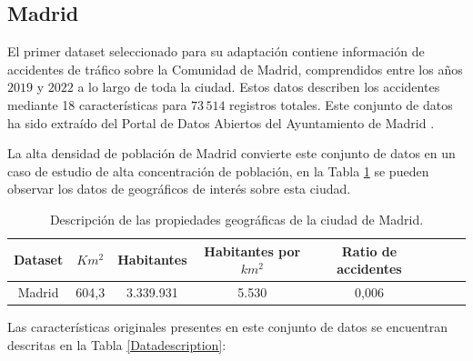 \documentclass{uathesis-es}
\begin{document}
{		
		
		\subsection*{Madrid}
		
		El primer dataset seleccionado para su adaptación contiene información de accidentes de tráfico sobre la Comunidad de Madrid, comprendidos entre los años $2019$ y $2022$ a lo largo de toda la ciudad. Estos datos describen los accidentes mediante 18 características para $73\,514$ registros totales. Este conjunto de datos ha sido extraído del Portal de Datos Abiertos del Ayuntamiento de Madrid \cite{InfoDatasetMadrid}. 
		
		La alta densidad de población de Madrid convierte este conjunto de datos en un caso de estudio de alta concentración de población, en la Tabla \ref{Madrid_statistics} se pueden observar los datos de geográficos de interés sobre esta ciudad.
		
		\begin{table}[ht]
			\begin{center}
				\begin{tabular}{|c|c||c|c|c|c|c|c|}
					\hline
					\textbf{Dataset} & \textbf{$Km^2$} & \textbf{Habitantes} & \textbf{Habitantes por $km^2$} & \textbf{Ratio de accidentes}
					\\ \hline \hline
					
					Madrid & 604,3 & 3.339.931 & 5.530 & 0,006 \\ \hline
					
				\end{tabular}
			\end{center}
			\caption{Descripción de las propiedades geográficas de la ciudad de Madrid.}
			\label{Madrid_statistics}
		\end{table}
		
		Las características originales presentes en este conjunto de datos se encuentran descritas en la Tabla \ref{Datadescription}:
		
}
\end{document}

